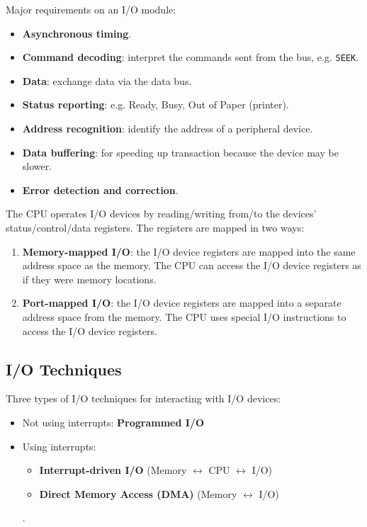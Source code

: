 \begin{multicols}{2}
Major requirements on an I/O module:
\begin{itemize}
    \item \textbf{Asynchronous timing}.
    \item \textbf{Command decoding}: interpret the commands sent from the bus, e.g. \texttt{SEEK}.
    \item \textbf{Data}: exchange data via the data bus.
    \item \textbf{Status reporting}: e.g. Ready, Busy, Out of Paper (printer).
    \item \textbf{Address recognition}: identify the address of a peripheral device.
    \item \textbf{Data buffering}: for speeding up transaction because the device may be slower.
    \item \textbf{Error detection and correction}.
\end{itemize}

\end{multicols}

The CPU operates I/O devices by reading/writing from/to the devices' status/control/data
registers. The registers are mapped in two ways:
\begin{enumerate}
    \item \textbf{Memory-mapped I/O}: the I/O device registers are mapped into the same
        address space as the memory. The CPU can access the I/O device registers as if
        they were memory locations.
    \item \textbf{Port-mapped I/O}: the I/O device registers are mapped into a separate
        address space from the memory. The CPU uses special I/O instructions to access
        the I/O device registers.
\end{enumerate}

\subsection{I/O Techniques}

Three types of I/O techniques for interacting with I/O devices:
\begin{itemize}
    \item Not using interrupts: \textbf{Programmed I/O}
    \item Using interrupts: \begin{itemize}
        \item \textbf{Interrupt-driven I/O} (Memory $\leftrightarrow$ CPU $\leftrightarrow$ I/O)
        \item \textbf{Direct Memory Access (DMA)} (Memory $\leftrightarrow$ I/O)
    \end{itemize}.
\end{itemize}

